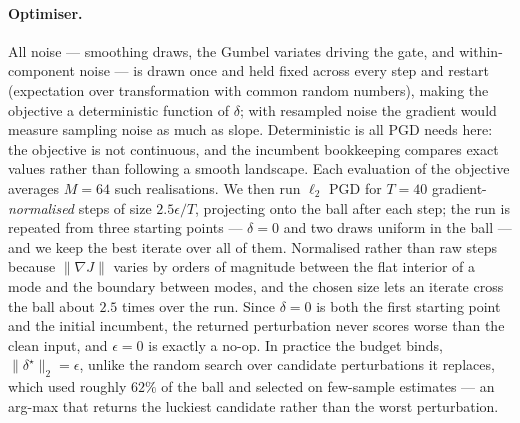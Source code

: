 \paragraph{Optimiser.} All noise --- smoothing draws, the Gumbel variates driving
the gate, and within-component noise --- is drawn once and held fixed across every
step and restart (expectation over transformation with common random numbers),
making the objective a deterministic function of $\delta$; with resampled noise
the gradient would measure sampling noise as much as slope. Deterministic is all
PGD needs here: the objective is not continuous, and the incumbent bookkeeping
compares exact values rather than following a smooth landscape. Each evaluation of the objective
averages $M=64$ such realisations. We then run $\ell_2$ PGD for $T=40$
gradient-\emph{normalised} steps of size $2.5\epsilon/T$, projecting onto the ball
after each step; the run is repeated from three starting points --- $\delta=0$ and
two draws uniform in the ball --- and we keep the best iterate over all of them.
Normalised rather than raw steps because $\|\nabla J\|$ varies by orders of
magnitude between the flat interior of a mode and the boundary between modes, and
the chosen size lets an iterate cross the ball about $2.5$ times over the run.
Since $\delta=0$ is both the first starting point and the initial incumbent, the
returned perturbation never scores worse than the clean input, and $\epsilon=0$ is
exactly a no-op. In practice the
budget binds, $\|\delta^\star\|_2=\epsilon$, unlike the random search over
candidate perturbations it replaces, which used roughly $62\%$ of the ball and
selected on few-sample estimates --- an arg-max that returns the luckiest
candidate rather than the worst perturbation.
